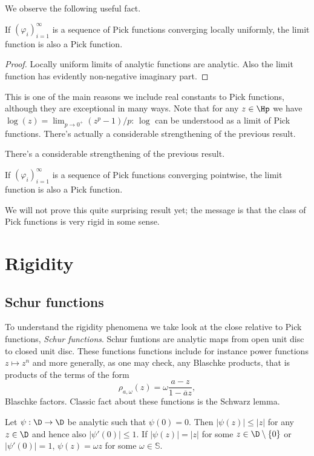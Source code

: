 We observe the following useful fact.

\begin{prop}
	If $(\varphi_{i})_{i = 1}^{\infty}$ is a sequence of Pick functions converging locally uniformly, the limit function is also a Pick function.
\end{prop}
\begin{proof}
	Locally uniform limits of analytic functions are analytic. Also the limit function has evidently non-negative imaginary part.
\end{proof}

This is one of the main reasons we include real constants to Pick functions, although they are exceptional in many ways. Note that for any $z \in \Hp$ we have $\log(z) = \lim_{p \to 0^{+}}(z^p - 1)/p$: $\log$ can be understood as a limit of Pick functions. There's actually a considerable strengthening of the previous result.

There's a considerable strengthening of the previous result.

\begin{prop}
	If $(\varphi_{i})_{i = 1}^{\infty}$ is a sequence of Pick functions converging pointwise, the limit function is also a Pick function.
\end{prop}

We will not prove this quite surprising result yet; the message is that the class of Pick functions is very rigid in some sense.

\section{Rigidity}

\subsection{Schur functions}

To understand the rigidity phenomena we take look at the close relative to Pick functions, \textit{Schur functions}. Schur funtions are analytic maps from open unit disc to closed unit disc. These functions functions include for instance power functions $z \mapsto z^{n}$ and more generally, as one may check, any Blaschke products, that is products of the terms of the form
\[
	\rho_{a, \omega}(z) = \omega \frac{a - z}{1 - \overline{a} z},
\]
Blaschke factors. Classic fact about these functions is the Schwarz lemma.

\begin{lause}
	Let $\psi : \D \to \D$ be analytic such that $\psi(0) = 0$. Then $|\psi(z)| \leq |z|$ for any $z \in \D$ and hence also $|\psi'(0)| \leq 1$. If $|\psi(z)| = |z|$ for some $z \in \D \setminus \{0\}$ or $|\psi'(0)| = 1$, $\psi(z) = \omega z$ for some $\omega \in \mathbb{S}$.
\end{lause}

